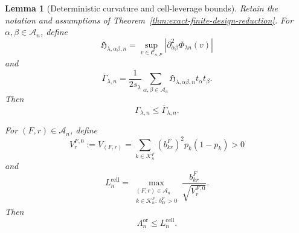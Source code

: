 \documentclass[11pt]{article}
\newtheorem{lemma}[theorem]{Lemma}
\theoremstyle{definition}
\newcommand{\1}{\mathbf 1}\newcommand{\op}{\operatorname}
\begin{document}
\begin{lemma}[Deterministic curvature and cell-leverage bounds]
\label{lem:deterministic-curvature-leverage}
Retain the notation and assumptions of
Theorem~\ref{thm:exact-finite-design-reduction}. For
$\alpha,\beta\in\mathcal A_n$, define
\begin{equation}
\mathfrak H_{\lambda,\alpha\beta,n}
=
\sup_{v\in\mathcal C_{n,P}}
\left|
\partial_{\alpha\beta}^2\Phi_{\lambda n}(v)
\right|
\label{eq:componentwise-hessian-envelope}
\end{equation}
and
\begin{equation}
\overline\Gamma_{\lambda,n}
=
\frac{1}{2s_\lambda}
\sum_{\alpha,\beta\in\mathcal A_n}
\mathfrak H_{\lambda,\alpha\beta,n}
t_\alpha t_\beta.
\label{eq:explicit-curvature-envelope}
\end{equation}
Then
\begin{equation}
\Gamma_{\lambda,n}
\le
\overline\Gamma_{\lambda,n}.
\label{eq:curvature-envelope-comparison}
\end{equation}

For $(F,r)\in\mathcal A_n$, define
\begin{equation}
V_r^{F,0}
:=
V_{(F,r)}
=
\sum_{k\in\mathcal K_n^F}
(b_{kr}^F)^2p_k(1-p_k)>0
\label{eq:positive-oracle-cell-meat}
\end{equation}
and
\begin{equation}
L_n^{\mathrm{cell}}
=
\max_{\substack{
(F,r)\in\mathcal A_n\\
k\in\mathcal K_n^F:\ b_{kr}^F>0}}
\frac{b_{kr}^F}{\sqrt{V_r^{F,0}}}.
\label{eq:cell-leverage-envelope}
\end{equation}
Then
\begin{equation}
\Lambda_n^{\mathrm{or}}
\le
L_n^{\mathrm{cell}}.
\label{eq:oracle-cell-leverage-bound}
\end{equation}
\end{lemma}
\end{document}
